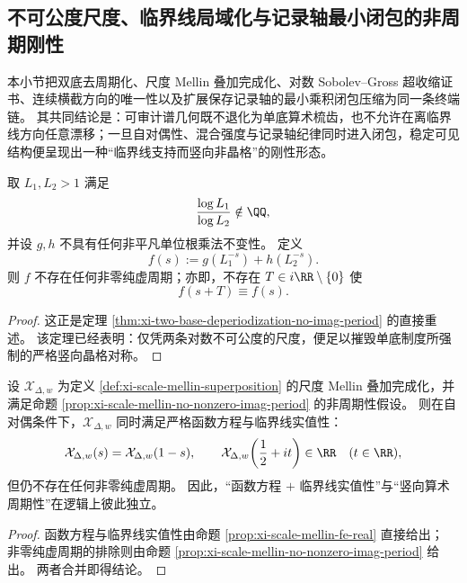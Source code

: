 \subsection{不可公度尺度、临界线局域化与记录轴最小闭包的非周期刚性}\label{subsec:conclusion-aperiodic-critical-rigidity-multiscale-ledger}
本小节把双底去周期化、尺度 Mellin 叠加完成化、对数 Sobolev--Gross 超收缩证书、连续横截方向的唯一性以及扩展保存记录轴的最小乘积闭包压缩为同一条终端链。
其共同结论是：可审计谱几何既不退化为单底算术梳齿，也不允许在离临界线方向任意漂移；一旦自对偶性、混合强度与记录轴纪律同时进入闭包，稳定可见结构便呈现出一种“临界线支持而竖向非晶格”的刚性形态。

\begin{theorem}[两不可公度底摧毁竖直晶格对称]\label{thm:conclusion-two-incommensurable-bases-destroy-vertical-lattice}
取 \(L_1,L_2>1\) 满足
\[
\frac{\log L_1}{\log L_2}\notin\QQ,
\]
并设 \(g,h\) 不具有任何非平凡单位根乘法不变性。
定义
\[
f(s):=g(L_1^{-s})+h(L_2^{-s}).
\]
则 \(f\) 不存在任何非零纯虚周期；亦即，不存在 \(T\in i\RR\setminus\{0\}\) 使
\[
f(s+T)\equiv f(s).
\]
\end{theorem}

\begin{proof}
这正是定理 \ref{thm:xi-two-base-deperiodization-no-imag-period} 的直接重述。
该定理已经表明：仅凭两条对数不可公度的尺度，便足以摧毁单底制度所强制的严格竖向晶格对称。
\end{proof}

\begin{theorem}[函数方程与临界线实值性并不强制竖向周期]\label{thm:conclusion-selfdual-scale-mellin-does-not-force-vertical-periodicity}
设 \(\mathcal X_{\Delta,w}\) 为定义 \ref{def:xi-scale-mellin-superposition} 的尺度 Mellin 叠加完成化，并满足命题 \ref{prop:xi-scale-mellin-no-nonzero-imag-period} 的非周期性假设。
则在自对偶条件下，\(\mathcal X_{\Delta,w}\) 同时满足严格函数方程与临界线实值性：
\[
\mathcal X_{\Delta,w}(s)=\mathcal X_{\Delta,w}(1-s),
\qquad
\mathcal X_{\Delta,w}\!\left(\frac12+it\right)\in\RR
\quad (t\in\RR),
\]
但仍不存在任何非零纯虚周期。
因此，“函数方程 \(+\) 临界线实值性”与“竖向算术周期性”在逻辑上彼此独立。
\end{theorem}

\begin{proof}
函数方程与临界线实值性由命题 \ref{prop:xi-scale-mellin-fe-real} 直接给出；
非零纯虚周期的排除则由命题 \ref{prop:xi-scale-mellin-no-nonzero-imag-period} 给出。
两者合并即得结论。
\end{proof}

